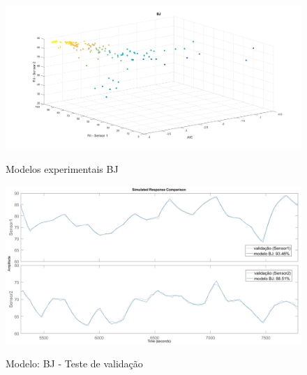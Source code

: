 \begin{apendicesenv}
\begin{figure}[h]
	\caption{Modelos experimentais BJ}
	\begin{center}
		\includegraphics[width=1.00\textwidth]{./5_images/tclabsp-models-BJ.png} 
		\label{fig:tclabsp-models-bj}
	\end{center}
	\centering
\end{figure}

\begin{figure}
	\caption{Modelo: BJ - Teste de validação}
	\begin{center}
		\includegraphics[width=1.00\textwidth]{./5_images/tclabsp-models-BJ-compare.png} 
		\label{fig:tclabsp-models-bj-compare}
	\end{center}
	\centering
\end{figure}


\end{apendicesenv}
